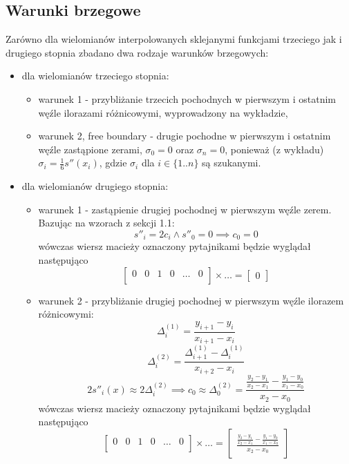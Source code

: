 \documentclass{article}
\begin{document}
\subsection{Warunki brzegowe}
Zarówno dla wielomianów interpolowanych sklejanymi funkcjami trzeciego jak i drugiego stopnia zbadano dwa rodzaje warunków brzegowych:
\begin{itemize}
    \item
    dla wielomianów trzeciego stopnia:
    \begin{itemize}
        \item
        warunek 1 - przybliżanie trzecich pochodnych w pierwszym i ostatnim węźle ilorazami różnicowymi,
        wyprowadzony na wykładzie,
        \item
        warunek 2, free boundary - drugie pochodne w pierwszym i ostatnim węźle zastąpione zerami,
        $\sigma_0 = 0$ oraz $\sigma_{n} = 0$, ponieważ (z wykładu) $\sigma_i = \frac{1}{6}s''(x_i)$,
        gdzie $\sigma_i$ dla $i\in\{1..n\}$ są szukanymi.
    \end{itemize}
    \item
    dla wielomianów drugiego stopnia:
    \begin{itemize}
        \item
        warunek 1 - zastąpienie drugiej pochodnej w pierwszym węźle zerem.
        Bazując na wzorach z sekcji 1.1:
        \[s''_i=2c_i \land s''_0 = 0 \implies c_0 = 0\]
        wówczas wiersz macieży oznaczony pytajnikami będzie wyglądał następująco
        \[
        \begin{bmatrix}
        0 & 0 & 1 & 0 & \hdots & 0 \\
        \end{bmatrix}
        \times
        \hdots
        =
        \begin{bmatrix}
        0
        \end{bmatrix}
        \]
        \item
        warunek 2 - przybliżanie drugiej pochodnej w pierwszym węźle ilorazem różnicowymi:
        \[\Delta_i^{(1)} = \frac{y_{i+1} - y_i}{x_{i+1} - x_i}\]
        \[\Delta_i^{(2)} = \frac{\Delta_{i+1}^{(1)} - \Delta_{i}^{(1)}}{x_{i+2}-x_i}\]
        \[2s''_i(x) \approx 2\Delta_i^{(2)} \implies c_0 \approx \Delta_0^{(2)} = \frac{\frac{y_2-y_1}{x_2-x_1}-\frac{y_1-y_0}{x_1-x_0}}{x_2-x_0}\]
        wówczas wiersz macieży oznaczony pytajnikami będzie wyglądał następująco
        \[
        \begin{bmatrix}
        0 & 0 & 1 & 0 & \hdots & 0 \\
        \end{bmatrix}
        \times
        \hdots
        =
        \begin{bmatrix}
        \frac{\frac{y_2-y_1}{x_2-x_1}-\frac{y_1-y_0}{x_1-x_0}}{x_2-x_0}
        \end{bmatrix}
        \]
    \end{itemize}
\end{itemize}
\end{document}
